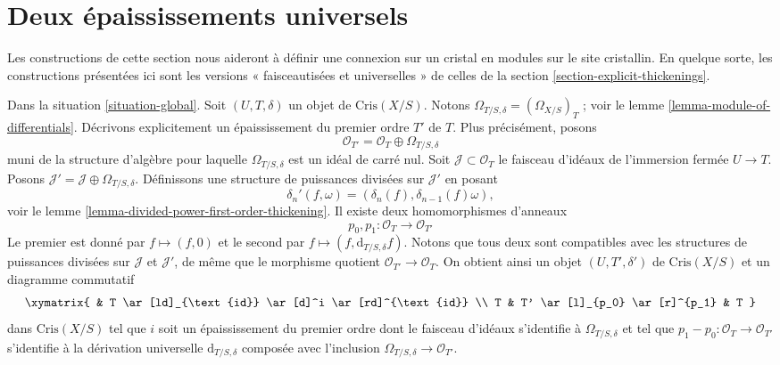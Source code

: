 \section{Deux épaississements universels}
\label{section-universal-thickenings}

\noindent
Les constructions de cette section nous aideront à définir une connexion sur
un cristal en modules sur le site cristallin. En quelque sorte, les constructions
présentées ici sont les versions « faisceautisées et universelles » de celles de la
section \ref{section-explicit-thickenings}.

\begin{remark}
\label{remark-first-order-thickening}
Dans la situation \ref{situation-global}.
Soit $(U, T, \delta)$ un objet de $\text{Cris}(X/S)$.
Notons $\Omega_{T/S, \delta} = (\Omega_{X/S})_T$ ; voir le
lemme \ref{lemma-module-of-differentials}.
Décrivons explicitement un épaississement du premier ordre $T'$ de
$T$. Plus précisément, posons
$$
\mathcal{O}_{T'} = \mathcal{O}_T \oplus \Omega_{T/S, \delta}
$$
muni de la structure d'algèbre pour laquelle $\Omega_{T/S, \delta}$ est un
idéal de carré nul. Soit $\mathcal{J} \subset \mathcal{O}_T$
le faisceau d'idéaux de l'immersion fermée $U \to T$. Posons
$\mathcal{J}' = \mathcal{J} \oplus \Omega_{T/S, \delta}$.
Définissons une structure de puissances divisées sur $\mathcal{J}'$ en posant
$$
\delta_n'(f, \omega) = (\delta_n(f), \delta_{n - 1}(f)\omega),
$$
voir le lemme \ref{lemma-divided-power-first-order-thickening}.
Il existe deux homomorphismes d'anneaux
$$
p_0, p_1 : \mathcal{O}_T \to \mathcal{O}_{T'}
$$
Le premier est donné par $f \mapsto (f, 0)$ et le second par
$f \mapsto (f, \text{d}_{T/S, \delta}f)$. Notons que tous deux sont compatibles
avec les structures de puissances divisées sur $\mathcal{J}$ et $\mathcal{J}'$,
de même que le morphisme quotient $\mathcal{O}_{T'} \to \mathcal{O}_T$.
On obtient ainsi un objet $(U, T', \delta')$ de $\text{Cris}(X/S)$
et un diagramme commutatif
$$
\xymatrix{
& T \ar[ld]_{\text{id}} \ar[d]^i \ar[rd]^{\text{id}} \\
T & T' \ar[l]_{p_0} \ar[r]^{p_1} & T
}
$$
dans $\text{Cris}(X/S)$ tel que $i$ soit un épaississement du premier ordre dont le faisceau
d'idéaux s'identifie à $\Omega_{T/S, \delta}$ et tel que
$p_1 - p_0 : \mathcal{O}_T \to \mathcal{O}_{T'}$
s'identifie à la dérivation universelle $\text{d}_{T/S, \delta}$
composée avec l'inclusion $\Omega_{T/S, \delta} \to \mathcal{O}_{T'}$.
\end{remark}

